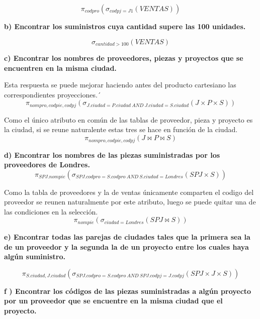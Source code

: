 \documentclass[a4paper,11pt]{article}
\begin{document}
\begin{equation*}
\pi_{codpro}(\sigma_{codpj=J1}(VENTAS))
\end{equation*}

\textbf{b) Encontrar los suministros cuya cantidad supere las 100 unidades.}

\begin{equation*}
\sigma_{cantidad>100}(VENTAS)
\end{equation*}

\textbf{c) Encontrar los nombres de proveedores, piezas y proyectos que se encuentren en
la misma ciudad.}


Esta respuesta se puede mejorar haciendo antes del producto cartesiano las correspondientes proyecciones.´
\begin{equation*}
\pi_{nompro,codpie,codpj}(\sigma_{J.ciudad=P.ciudad \> AND \> J.ciudad=S.ciudad}(J\times P\times S))
\end{equation*}

Como el único atributo en común de las tablas de proveedor, pieza y proyecto es la ciudad, si se reune naturalente estas tres se hace en función de la ciudad.
\begin{equation*}
\pi_{nompro,codpie,codpj}(J\Join P \Join S)
\end{equation*}

\textbf{d) Encontrar los nombres de las piezas suministradas por los proveedores de Londres.}
\begin{equation*}
\pi_{SPJ.nompie}(\sigma_{SPJ.codpro=S.codpro \> AND  \> S.ciudad=Londres}(SPJ \times S)) 
\end{equation*}


Como la tabla de proveedores y la de ventas únicamente comparten el codigo del proveedor se reunen naturalmente por este atributo, luego se puede quitar una de las condiciones en la selección.
\begin{equation*}
\pi_{nompie}(\sigma_{ciudad=Londres}(SPJ \Join S))
\end{equation*}

\textbf{e) Encontrar todas las parejas de ciudades tales que la primera sea la de un proveedor y la segunda la de un proyecto entre los cuales haya algún suministro.}

\begin{equation*}
\pi_{S.ciudad,J.ciudad}(\sigma_{SPJ.codpro=S.codpro \> AND \> SPJ.codpj=J.codpj}(SPJ\times J \times S))
\end{equation*}

\textbf{f ) Encontrar los códigos de las piezas suministradas a algún proyecto por un proveedor que se encuentre en la misma ciudad que el proyecto.}
\end{document}
